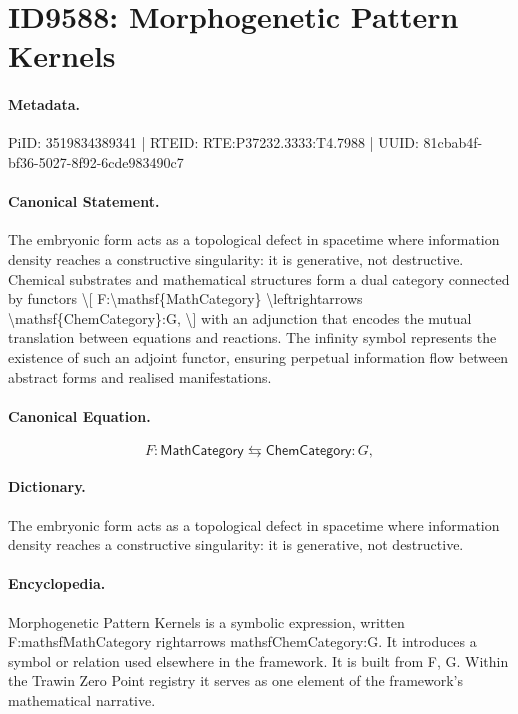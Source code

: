 \section*{ID9588: Morphogenetic Pattern Kernels}
\paragraph{Metadata.}
PiID: 3519834389341 | RTEID: RTE:P37232.3333:T4.7988 | UUID: 81cbab4f-bf36-5027-8f92-6cde983490c7

\paragraph{Canonical Statement.}
The embryonic form acts as a topological defect in spacetime where information density reaches a constructive singularity: it is generative, not destructive. Chemical substrates and mathematical structures form a dual category connected by functors \textbackslash{}[ F:\textbackslash{}mathsf\{MathCategory\} \textbackslash{}leftrightarrows \textbackslash{}mathsf\{ChemCategory\}:G, \textbackslash{}] with an adjunction that encodes the mutual translation between equations and reactions. The infinity symbol represents the existence of such an adjoint functor, ensuring perpetual information flow between abstract forms and realised manifestations.

\paragraph{Canonical Equation.}
\[
F:\mathsf{MathCategory} \leftrightarrows \mathsf{ChemCategory}:G,
\]

\paragraph{Dictionary.}
The embryonic form acts as a topological defect in spacetime where information density reaches a constructive singularity: it is generative, not destructive.

\paragraph{Encyclopedia.}
Morphogenetic Pattern Kernels is a symbolic expression, written F:mathsfMathCategory rightarrows mathsfChemCategory:G. It introduces a symbol or relation used elsewhere in the framework. It is built from F, G. Within the Trawin Zero Point registry it serves as one element of the framework's mathematical narrative.
